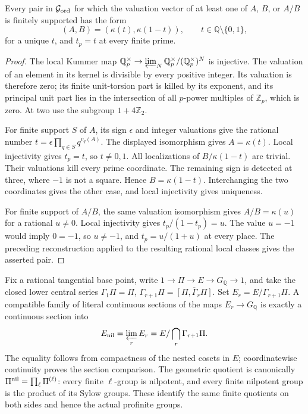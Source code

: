 \begin{proposition}
\label{prop:ghost-finite-support}
Every pair in \(\mathcal G_{\rm ord}\) for which the valuation
vector of at least one of \(A\), \(B\), or \(A/B\) is
finitely supported has the form
\[
       (A,B)=(\kappa(t),\kappa(1-t)),
       \qquad t\in\mathbb Q\setminus\{0,1\},
\]
for a unique \(t\), and \(t_p=t\) at every finite prime.
\end{proposition}
\begin{proof}
The local Kummer map \(\mathbb Q_p^\times\to
\varprojlim_N\mathbb Q_p^\times/(\mathbb Q_p^\times)^N\)
is injective. The valuation of an element in its kernel is divisible
by every positive integer. Its valuation is therefore zero; its
finite unit-torsion part is killed by its exponent, and its principal
unit part lies in the intersection of all \(p\)-power multiples of
\(\mathbb Z_p\), which is zero. At two use the subgroup
\(1+4\mathbb Z_2\).

For finite support \(S\) of \(A\), its sign \(\epsilon\) and
integer valuations give the rational number
\(t=\epsilon\prod_{q\in S}q^{v_q(A)}\). The displayed
isomorphism gives \(A=\kappa(t)\). Local injectivity gives
\(t_p=t\), so \(t\ne0,1\). All localizations of
\(B/\kappa(1-t)\) are trivial. Their valuations kill every prime
coordinate. The remaining sign is detected at three, where
\(-1\) is not a square. Hence \(B=\kappa(1-t)\). Interchanging
the two coordinates gives the other case, and local injectivity
gives uniqueness.

For finite support of \(A/B\), the same valuation isomorphism
gives \(A/B=\kappa(u)\) for a rational \(u\ne0\). Local
injectivity gives \(t_p/(1-t_p)=u\). The value \(u=-1\)
would imply \(0=-1\), so \(u\ne-1\), and
\(t_p=u/(1+u)\) at every place. The preceding reconstruction
applied to the resulting rational local classes gives the
asserted pair.
\end{proof}

Fix a rational tangential base point, write
\(1\to\Pi\to E\to G_{\mathbb Q}\to1\), and take the closed
lower central series \(\Gamma_1\Pi=\Pi\),
\(\Gamma_{r+1}\Pi=\overline{[\Pi,\Gamma_r\Pi]}\).
Set \(E_r=E/\Gamma_{r+1}\Pi\). A compatible family of literal
continuous sections of the maps \(E_r\to G_{\mathbb Q}\) is
exactly a continuous section into
\[
 E_{\rm nil}=\varprojlim_rE_r
       =E/\bigcap_r\Gamma_{r+1}\Pi.
\]
The equality follows from compactness of the nested cosets in
\(E\); coordinatewise continuity proves the section comparison.
The geometric quotient is canonically
\(\Pi^{\rm nil}=\prod_\ell\Pi^{(\ell)}\): every finite
\(\ell\)-group is nilpotent, and every finite nilpotent group
is the product of its Sylow groups. These identify the same finite
quotients on both sides and hence the actual profinite groups.

